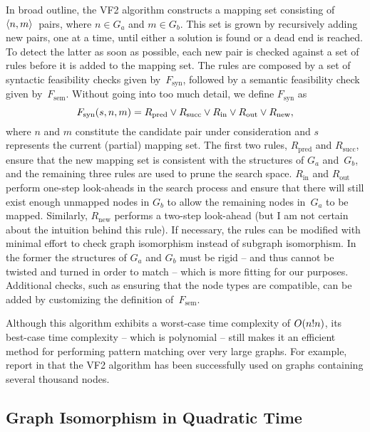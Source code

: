 In broad outline, the \gls{VF2} algorithm constructs a mapping set consisting of
\mbox{$\mTuple{n, m}$}~pairs, where \mbox{$n \in G_a$} and \mbox{$m \in G_b$}.
%
This set is grown by recursively adding new pairs, one at a time, until either a
solution is found or a dead end is reached.
%
To detect the latter as soon as possible, each new pair is checked against a set
of rules before it is added to the mapping set.
%
The rules are composed by a set of syntactic feasibility checks given
by~$F_{\text{syn}}$, followed by a semantic feasibility check given
by~$F_{\text{sem}}$.
%
Without going into too much detail, we define $F_{\text{syn}}$ as
%
\begin{displaymath}
  F_{\text{syn}}(s, n, m) = R_{\text{pred}} \vee R_{\text{succ}} \vee
  R_{\text{in}} \vee R_{\text{out}} \vee R_{\text{new}},
\end{displaymath}
%
where $n$ and $m$ constitute the candidate pair under consideration and $s$
represents the current (partial) mapping set.
%
The first two rules, $R_{\text{pred}}$ and $R_{\text{succ}}$, ensure that the
new mapping set is consistent with the structures of $G_a$ and~$G_b$, and the
remaining three rules are used to prune the search space.
%
$R_{\text{in}}$ and $R_{\text{out}}$ perform one-step look-aheads in the search
process and ensure that there will still exist enough unmapped nodes in $G_b$ to
allow the remaining \glspl{node} in~$G_a$ to be mapped.
%
Similarly, $R_{\text{new}}$ performs a two-step look-ahead (but I am not certain
about the intuition behind this rule).
%
If necessary, the rules can be modified with minimal effort to check \gls{graph
  isomorphism} instead of \gls{subgraph isomorphism}.
%
In the former the structures of $G_a$ and $G_b$ must be rigid -- and thus cannot
be twisted and turned in order to match -- which is more fitting for our
purposes.
%
Additional checks, such as ensuring that the \gls{node} types are compatible,
can be added by customizing the definition of~$F_{\text{sem}}$.

Although this algorithm exhibits a worst-case time complexity of
\mbox{$O(n!n)$}, its best-case time complexity -- which is polynomial --
still makes it an efficient method for performing \gls{pattern matching} over
very large \glspl{graph}.
%
For example, \citeauthor{CordellaEtAl:2001} report in \cite{CordellaEtAl:2001} that the
\gls{VF2} algorithm has been successfully used on \glspl{graph} containing
several thousand \glspl{node}.


\subsection{Graph Isomorphism in Quadratic Time}

